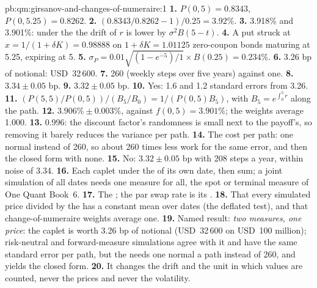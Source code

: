 \begin{solution}{pb:qm:girsanov-and-changes-of-numeraire:1}
\textbf{1.} $P(0,5) = 0.8343$, $P(0,5.25) = 0.8262$.
\textbf{2.} $(0.8343/0.8262 - 1)/0.25 = 3.92\%$.
\textbf{3.} 3.918\% and 3.901\%: under the  the drift of $r$ is lower by $\sigma^2B(5 - t)$.
\textbf{4.} A put struck at $x = 1/(1 + \delta K) = 0.98888$ on $1 + \delta K = 1.01125$ zero-coupon bonds maturing
at 5.25, expiring at 5.
\textbf{5.} $\sigma_P = 0.01\sqrt{(1 - e^{-5})/1}\times B(0.25) = 0.234\%$.
\textbf{6.} 3.26 bp of notional: USD~32\,600.
\textbf{7.} 260 (weekly steps over five years) against one.
\textbf{8.} $3.34 \pm 0.05$ bp.
\textbf{9.} $3.32 \pm 0.05$ bp.
\textbf{10.} Yes: 1.6 and 1.2 standard errors from 3.26.
\textbf{11.} $(P(5,5)/P(0,5))/(B_5/B_0) = 1/(P(0,5)B_5)$, with $B_5 = e^{\int_0^5r}$ along the path.
\textbf{12.} $3.906\% \pm 0.003\%$, against $f(0,5) = 3.901\%$; the weights average 1.000.
\textbf{13.} 0.996: the discount factor's randomness is small next to the payoff's, so removing it
barely reduces the variance per path.
\textbf{14.} The cost per path: one normal instead of 260, so about 260 times less work for the same
error, and then the closed form with none.
\textbf{15.} No: $3.32 \pm 0.05$ bp with 208 steps a year, within noise of 3.34.
\textbf{16.} Each caplet under the  of its own date, then sum; a joint simulation of all
dates needs one measure for all, the spot or terminal measure of One Quant Book~6.
\textbf{17.} The ; the par swap rate is its .
\textbf{18.} That every simulated price divided by the  has a constant mean over dates (the
deflated  test), and that change-of-numeraire weights average one.
\textbf{19.} Named result: \emph{two measures, one price}: the caplet is worth 3.26 bp of notional
(USD~32\,600 on USD~100 million); risk-neutral and forward-measure simulations agree with it and have
the same standard error per path, but the  needs one normal a path instead of 260,
and yields the closed form.
\textbf{20.} It changes the drift and the unit in which values are counted, never the prices and never
the volatility.
\end{solution}

